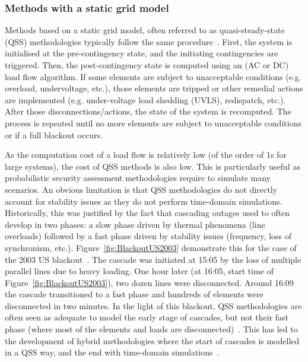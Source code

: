 \subsubsection{Methods with a static grid model}
\label{sec:QSSmethods}

Methods based on a static grid model, often referred to as quasi-steady-state (QSS) methodologies typically follow the same procedure~\cite{Benchmarking2018}. First, the system is initialised at the pre-contingency state, and the initiating contingencies are triggered. Then, the post-contingency state is computed using an (AC or DC) load flow algorithm. If some elements are subject to unacceptable conditions (e.g. overload, undervoltage, etc.), those elements are tripped or other remedial actions are implemented (e.g. under-voltage load shedding (UVLS), redispatch, etc.). After those disconnections/actions, the state of the system is recomputed. The process is repeated until no more elements are subject to unacceptable conditions or if a full blackout occurs.

As the computation cost of a load flow is relatively low (of the order of 1s for large systems), the cost of QSS methods is also low. This is particularly useful as probabilistic security assessment methodologies require to simulate many scenarios. An obvious limitation is that QSS methodologies do not directly account for stability issues as they do not perform time-domain simulations. Historically, this was justified by the fact that cascading outages used to often develop in two phases: a slow phase driven by thermal phenomena (line overloads) followed by a fast phase driven by stability issues (frequency, loss of synchronism, etc.). Figure~\ref{fig:BlackoutUS2003} demonstrate this for the case of the 2003 US blackout~\cite{USBlackout2003}. The cascade was initiated at 15:05 by the loss of multiple parallel lines due to heavy loading. One hour later (at 16:05, start time of Figure~\ref{fig:BlackoutUS2003}), two dozen lines were disconnected. Around 16:09 the cascade transitioned to a fast phase and hundreds of elements were disconnected in two minutes. In the light of this blackout, QSS methodologies are often seen as adequate to model the early stage of cascades, but not their fast phase (where most of the elements and loads are disconnected)~\cite{BenchmarkingStaticVsDynamic}. This has led to the development of hybrid methodologies where the start of cascades is modelled in a QSS way, and the end with time-domain simulations~\cite{TwoLevelPSA}.

